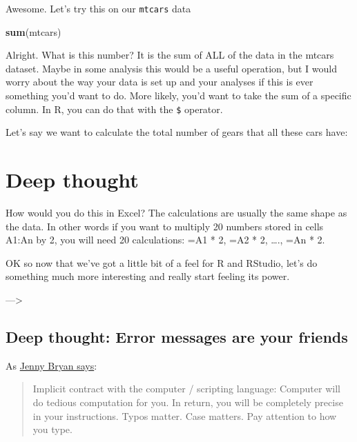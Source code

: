 \documentclass[]{book}
\newenvironment{Shaded}{\begin{snugshade}}{\end{snugshade}}
\newcommand{\KeywordTok}[1]{\textcolor[rgb]{0.13,0.29,0.53}{\textbf{#1}}}
\newcommand{\NormalTok}[1]{#1}
\newcommand{\OperatorTok}[1]{\textcolor[rgb]{0.81,0.36,0.00}{\textbf{#1}}}
\begin{document}
Awesome. Let's try this on our \texttt{mtcars} data

\begin{Shaded}
\begin{Highlighting}[]
\KeywordTok{sum}\NormalTok{(mtcars)}
\end{Highlighting}
\end{Shaded}

Alright. What is this number? It is the sum of ALL of the data in the mtcars dataset. Maybe in some analysis this would be a useful operation, but I would worry about the way your data is set up and your analyses if this is ever something you'd want to do. More likely, you'd want to take the sum of a specific column. In R, you can do that with the \texttt{\$} operator.

Let's say we want to calculate the total number of gears that all these cars have:

\begin{Shaded}
\end{Shaded}

\hypertarget{deep-thought}{%
\section{Deep thought}\label{deep-thought}}

How would you do this in Excel?
The calculations are usually the same shape as the data. In other words if you want to multiply 20 numbers stored in cells A1:An by 2, you will need 20 calculations: =A1 * 2, =A2 * 2, \ldots{}., =An * 2.

OK so now that we've got a little bit of a feel for R and RStudio, let's do something much more interesting and really start feeling its power.

---\textgreater{}

\hypertarget{deep-thought-error-messages-are-your-friends}{%
\subsection{Deep thought: Error messages are your friends}\label{deep-thought-error-messages-are-your-friends}}

As \href{https://stat545.com/r-basics.html}{Jenny Bryan says}:

\begin{quote}
Implicit contract with the computer / scripting language: Computer will do tedious computation for you. In return, you will be completely precise in your instructions. Typos matter. Case matters. Pay attention to how you type.
\end{quote}
\end{document}
